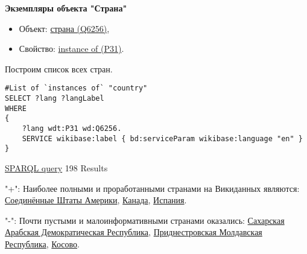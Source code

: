 \textbf{Экземпляры объекта "Страна"}

\begin{itemize}
    \item Объект: \href{https://www.wikidata.org/wiki/Q6256}{страна (Q6256)},
    \item Свойство: \href{https://www.wikidata.org/wiki/Property:P31}{instance of (P31)}.
\end{itemize}

Построим список всех стран.

\begin{lstlisting}[language=SPARQL]
#List of `instances of` "country" 
SELECT ?lang ?langLabel
WHERE
{
    ?lang wdt:P31 wd:Q6256.
    SERVICE wikibase:label { bd:serviceParam wikibase:language "en" }
}
\end{lstlisting}

\href{https://query.wikidata.org/#%23added%202017-02%0A%23List%20of%20%60instances%20of%60%20%22country%22%20%0ASELECT%20%3Flang%20%3FlangLabel%0AWHERE%0A%7B%0A%20%20%20%20%3Flang%20wdt%3AP31%20wd%3AQ6256.%0A%20%20%20%20SERVICE%20wikibase%3Alabel%20%7B%20bd%3AserviceParam%20wikibase%3Alanguage%20%22en%22%20%7D%0A%7D}{SPARQL query} 198 Results

"+": Наиболее полными и проработанными странами на Викиданных являются:
\href{https://www.wikidata.org/wiki/Q30}{Соединённые Штаты Америки}, 
\href{https://www.wikidata.org/wiki/Q16}{Канада},
\href{https://www.wikidata.org/wiki/Q29}{Испания}.

"-": Почти пустыми и малоинформативными странами оказались:
\href{https://www.wikidata.org/wiki/Q40362}{Сахарская Арабская Демократическая Республика},
\href{https://www.wikidata.org/wiki/Q907112}{Приднестровская Молдавская Республика},
\href{https://www.wikidata.org/wiki/Q1246}{Косово}.
